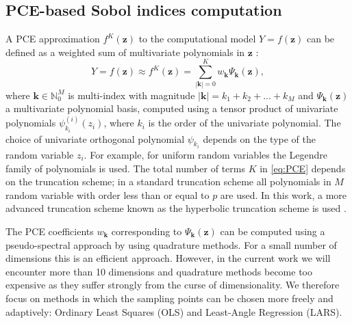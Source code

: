 \subsection{PCE-based Sobol indices computation}
A PCE approximation $f^{K}(\mathbf{z})$ to the computational model $Y=f(\mathbf{z})$ can be defined as a weighted sum of multivariate polynomials in $\mathbf{z}$ \cite{RSmith}:
\begin{equation}\label{eq:PCE}
Y= f(\mathbf{z}) \approx f^{K}(\mathbf{z}) = \sum_{|\mathbf{k}| = 0}^K w_{\mathbf{k}}\Psi_{\mathbf{k}}(\mathbf{z}),
\end{equation}
where $\mathbf{k}\in \mathbb{N}_0^M$ is multi-index with magnitude $|\mathbf{k}| = k_1+k_2 + ... + k_M$ and $\Psi_{\mathbf{k}}(\mathbf{z})$ a multivariate polynomial basis, computed using a tensor product of univariate polynomials $\psi_{k_i}^{(i)}(z_i)$, 
where $k_i$ is the order of the univariate polynomial. The choice of univariate orthogonal polynomial $\psi_{k_i}$ depends on the type of the random variable $z_i$. For example, for uniform random variables the Legendre family of polynomials is used. 
The total number of terms $K$ in \eqref{eq:PCE} depends on the truncation scheme; in a standard truncation scheme  all polynomials in $M$ random variable with order less than or equal to $p$ are used. In this work, a more advanced truncation scheme known as the hyperbolic truncation scheme is used \cite{BlatmanThesis}. 

The PCE coefficients $w_{\mathbf{k}}$ corresponding to $\Psi_{\mathbf{k}}(\mathbf{z})$ can be computed using a pseudo-spectral approach by using quadrature methods. For a small number of dimensions this is an efficient approach. However, in the current work we will encounter more than 10 dimensions and quadrature methods become  too expensive as they suffer strongly from the curse of dimensionality. We therefore focus on methods in which the sampling points can be chosen more freely and adaptively: Ordinary Least Squares (OLS) and Least-Angle Regression (LARS).

